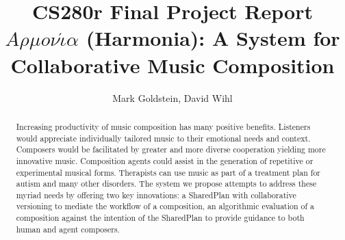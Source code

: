 \documentclass[final,authoryear,11pt,times]{elsarticle}
\begin{document}
\begin{frontmatter}



\title{CS280r Final Project Report \\ $A \rho \mu o \nu \acute{\iota} \alpha$ (Harmonia): A System for Collaborative Music Composition}


\author{Mark Goldstein, David Wihl}
\address{\{markgoldstein,davidwihl\}@g.harvard.edu}

\begin{abstract}

Increasing productivity of music composition has many positive benefits. Listeners
would appreciate individually tailored music to their emotional needs and context.
Composers would be facilitated by greater and more diverse cooperation yielding more
innovative music. Composition agents could assist in the generation of repetitive or 
experimental musical forms. Therapists can use music as part of a treatment plan 
for autism and
many other disorders. The system we propose attempts to address these myriad needs 
by offering two key innovations: a SharedPlan with collaborative versioning to mediate the workflow of a composition, an algorithmic evaluation of a composition against the intention of the
SharedPlan to provide guidance to both human and agent composers.

\end{abstract}
\end{frontmatter}

\end{document}
